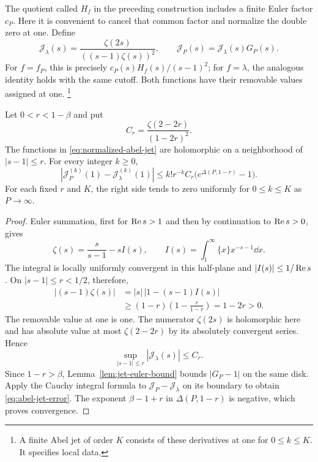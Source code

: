 The quotient called $H_f$ in the preceding construction includes a
finite Euler factor $c_P$. Here it is convenient to cancel that common
factor and normalize the double zero at one. Define
\begin{equation}\label{eq:normalized-abel-jet}
 \mathcal J_\lambda(s)=\frac{\zeta(2s)}{((s-1)\zeta(s))^2},\qquad
 \mathcal J_P(s)=\mathcal J_\lambda(s)G_P(s).
\end{equation}
For $f=f_P$, this is precisely $c_P(s)H_f(s)/(s-1)^2$; for
$f=\lambda$, the analogous identity holds with the same cutoff.
Both functions have their removable values assigned at one.
\footnote{A finite Abel jet of order $K$ consists of these derivatives
at one for $0\le k\le K$. It specifies local data.}

\begin{theorem}
\label{thm:finite-abel-jets}
Let $0<r<1-\beta$ and put
\[
 C_r=\frac{\zeta(2-2r)}{(1-2r)^2}.
\]
The functions in \eqref{eq:normalized-abel-jet} are holomorphic on a
neighborhood of $|s-1|\le r$. For every integer $k\ge0$,
\begin{equation}\label{eq:abel-jet-error}
 \left|\mathcal J_P^{(k)}(1)-\mathcal J_\lambda^{(k)}(1)\right|
 \le k!r^{-k}C_r\bigl(e^{\Delta(P,1-r)}-1\bigr).
\end{equation}
For each fixed $r$ and $K$, the right side tends to zero uniformly for
$0\le k\le K$ as $P\to\infty$.
\end{theorem}
\begin{proof}
Euler summation, first for $\operatorname{Re} s>1$ and then by continuation to
$\operatorname{Re} s>0$, gives
\[
 \zeta(s)=\frac{s}{s-1}-sI(s),\qquad
 I(s)=\int_1^\infty\{x\}x^{-s-1}\dd x.
\]
The integral is locally uniformly convergent in this half-plane and
$|I(s)|\le1/\operatorname{Re} s$. On $|s-1|\le r<1/2$, therefore,
\begin{align*}
 |(s-1)\zeta(s)|
 &=|s|\,|1-(s-1)I(s)|\\
 &\ge(1-r)\left(1-\frac r{1-r}\right)=1-2r>0.
\end{align*}
The removable value at one is one. The numerator $\zeta(2s)$ is
holomorphic here and has absolute value at most $\zeta(2-2r)$ by
its absolutely convergent series. Hence
\[
 \sup_{|s-1|\le r}|\mathcal J_\lambda(s)|\le C_r.
\]
Since $1-r>\beta$, Lemma~\ref{lem:jet-euler-bound} bounds
$|G_P-1|$ on the same disk. Apply the Cauchy integral formula to
$\mathcal J_P-\mathcal J_\lambda$ on its boundary to obtain
\eqref{eq:abel-jet-error}. The exponent $\beta-1+r$ in
$\Delta(P,1-r)$ is negative, which proves convergence.
\end{proof}

